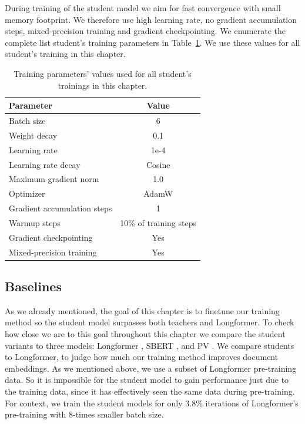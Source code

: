 During training of the student model we aim for fast convergence with small
memory footprint. We therefore use high learning rate, no gradient accumulation
steps, mixed-precision training and gradient checkpointing. We enumerate the
complete list student's training parameters in
Table~\ref{table:student_train_params}. We use these values for all student's
training in this chapter.


\begin{table}
  \centering
  \footnotesize

  \begin{tabular}{l c}
    \toprule
    Parameter & Value \\
    \midrule
    Batch size & 6 \\
    Weight decay & 0.1 \\
    Learning rate & 1e-4 \\
    Learning rate decay & Cosine \\
    Maximum gradient norm & 1.0 \\
    Optimizer & AdamW \\
    Gradient accumulation steps & 1 \\
    Warmup steps & 10\% of training steps \\
    Gradient checkpointing & Yes \\
    Mixed-precision training & Yes \\
    \bottomrule
  \end{tabular}

  \caption{Training parameters' values used for all student's trainings in this
  chapter.}

  \label{table:student_train_params}

\end{table}

\subsection{Baselines}

As we already mentioned, the goal of this chapter is to finetune our training
method so the student model surpasses both teachers and Longformer. To check
how close we are to this goal throughout this chapter we compare the student
variants to three models: Longformer \citep{beltagy2020longformer}, SBERT
\citep{reimers2019sentence}, and PV \citep{le2014distributed}. We compare
students to Longformer, to judge how much our training method improves document
embeddings. As we mentioned above, we use a subset of Longformer pre-training
data. So it is impossible for the student model to gain performance just due to
the training data, since it has effectively seen the same data during
pre-training. For context, we train the student models for only 3.8\%
iterations of Longformer's pre-training with 8-times smaller batch size.

